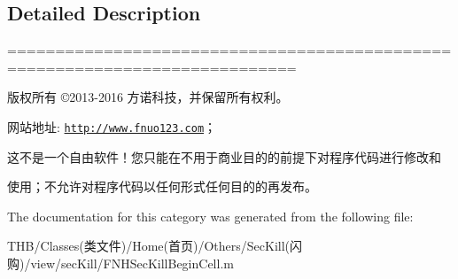 \subsection{Detailed Description}
============================================================================

版权所有 ©2013-\/2016 方诺科技，并保留所有权利。

网站地址\+: \href{http://www.fnuo123.com}{\tt http\+://www.\+fnuo123.\+com}； 



这不是一个自由软件！您只能在不用于商业目的的前提下对程序代码进行修改和

使用；不允许对程序代码以任何形式任何目的的再发布。 

 

The documentation for this category was generated from the following file\+:\begin{DoxyCompactItemize}
\item 
T\+H\+B/\+Classes(类文件)/\+Home(首页)/\+Others/\+Sec\+Kill(闪购)/view/sec\+Kill/F\+N\+H\+Sec\+Kill\+Begin\+Cell.\+m\end{DoxyCompactItemize}
